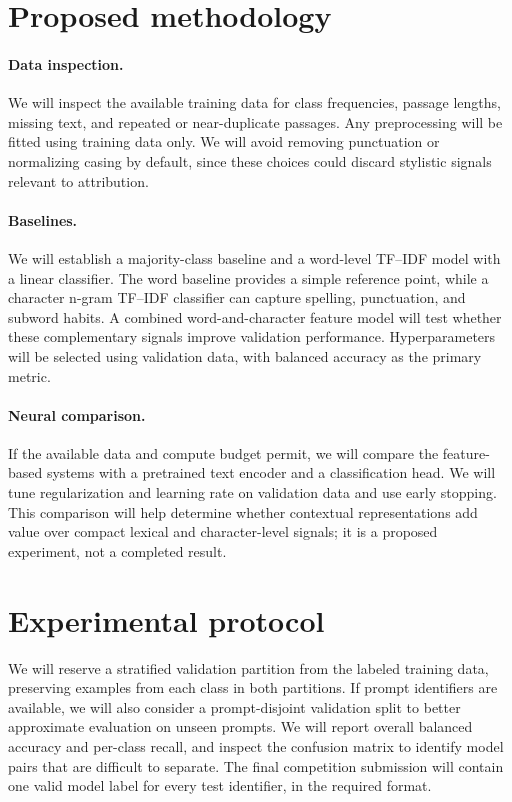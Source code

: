 \documentclass{article}
\begin{document}
\section{Proposed methodology}
\paragraph{Data inspection.} We will inspect the available training data for class frequencies, passage lengths, missing text, and repeated or near-duplicate passages. Any preprocessing will be fitted using training data only. We will avoid removing punctuation or normalizing casing by default, since these choices could discard stylistic signals relevant to attribution.

\paragraph{Baselines.} We will establish a majority-class baseline and a word-level TF--IDF model with a linear classifier. The word baseline provides a simple reference point, while a character n-gram TF--IDF classifier can capture spelling, punctuation, and subword habits. A combined word-and-character feature model will test whether these complementary signals improve validation performance. Hyperparameters will be selected using validation data, with balanced accuracy as the primary metric.

\paragraph{Neural comparison.} If the available data and compute budget permit, we will compare the feature-based systems with a pretrained text encoder and a classification head. We will tune regularization and learning rate on validation data and use early stopping. This comparison will help determine whether contextual representations add value over compact lexical and character-level signals; it is a proposed experiment, not a completed result.

\section{Experimental protocol}
We will reserve a stratified validation partition from the labeled training data, preserving examples from each class in both partitions. If prompt identifiers are available, we will also consider a prompt-disjoint validation split to better approximate evaluation on unseen prompts. We will report overall balanced accuracy and per-class recall, and inspect the confusion matrix to identify model pairs that are difficult to separate. The final competition submission will contain one valid model label for every test identifier, in the required format.
\end{document}
